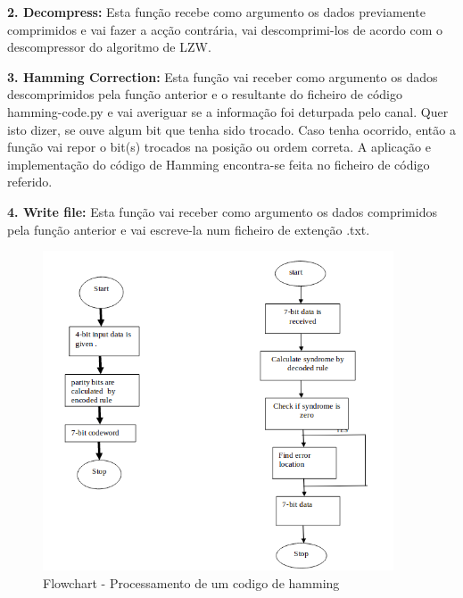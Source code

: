 \documentclass{article}
\begin{document}
\begin{titlepage}
    \indent\textbf{2. Decompress:}
    Esta função recebe como argumento os dados previamente comprimidos e vai fazer a acção contrária, vai descomprimi-los de acordo com o descompressor do algoritmo de LZW.
    \vspace{0.5cm}
    
    \indent\textbf{3. Hamming Correction:}
    Esta função vai receber como argumento os dados descomprimidos pela função anterior e o resultante do ficheiro de código hamming-code.py e vai averiguar se a informação foi deturpada pelo canal. Quer isto dizer, se ouve algum bit que tenha sido trocado. Caso tenha ocorrido, então a função vai repor o bit(s) trocados na posição ou ordem correta. A aplicação e implementação do código de Hamming encontra-se feita no ficheiro de código referido.
    \vspace{0.5cm}
    
    \indent\textbf{4. Write file:}
    Esta função vai receber como argumento os dados comprimidos pela função anterior e vai escreve-la num ficheiro de extenção .txt.
    \vspace{0.5cm}
    \begin{figure}[!ht]
        \centering
        \includegraphics[width=295pt]{hamming.png}
        \caption{Flowchart - Processamento de um codigo de hamming}
    \end{figure}

    \begin{figure}[!ht]
        \flushleft
\end{figure}
\end{titlepage}
\end{document}
